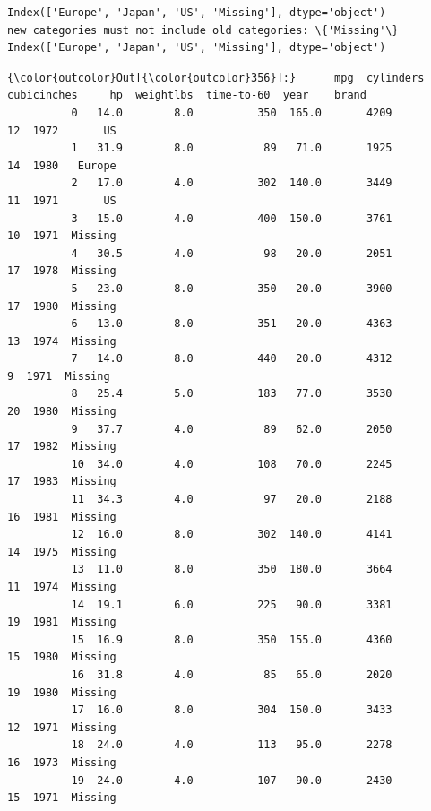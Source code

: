 \documentclass[11pt]{article}
\begin{document}
    \begin{Verbatim}[commandchars=\\\{\}]
Index(['Europe', 'Japan', 'US', 'Missing'], dtype='object')
new categories must not include old categories: \{'Missing'\}
Index(['Europe', 'Japan', 'US', 'Missing'], dtype='object')

    \end{Verbatim}

\begin{Verbatim}[commandchars=\\\{\}]
{\color{outcolor}Out[{\color{outcolor}356}]:}      mpg  cylinders  cubicinches     hp  weightlbs  time-to-60  year    brand
          0   14.0        8.0          350  165.0       4209          12  1972       US
          1   31.9        8.0           89   71.0       1925          14  1980   Europe
          2   17.0        4.0          302  140.0       3449          11  1971       US
          3   15.0        4.0          400  150.0       3761          10  1971  Missing
          4   30.5        4.0           98   20.0       2051          17  1978  Missing
          5   23.0        8.0          350   20.0       3900          17  1980  Missing
          6   13.0        8.0          351   20.0       4363          13  1974  Missing
          7   14.0        8.0          440   20.0       4312           9  1971  Missing
          8   25.4        5.0          183   77.0       3530          20  1980  Missing
          9   37.7        4.0           89   62.0       2050          17  1982  Missing
          10  34.0        4.0          108   70.0       2245          17  1983  Missing
          11  34.3        4.0           97   20.0       2188          16  1981  Missing
          12  16.0        8.0          302  140.0       4141          14  1975  Missing
          13  11.0        8.0          350  180.0       3664          11  1974  Missing
          14  19.1        6.0          225   90.0       3381          19  1981  Missing
          15  16.9        8.0          350  155.0       4360          15  1980  Missing
          16  31.8        4.0           85   65.0       2020          19  1980  Missing
          17  16.0        8.0          304  150.0       3433          12  1971  Missing
          18  24.0        4.0          113   95.0       2278          16  1973  Missing
          19  24.0        4.0          107   90.0       2430          15  1971  Missing
\end{Verbatim}
            
\end{document}
